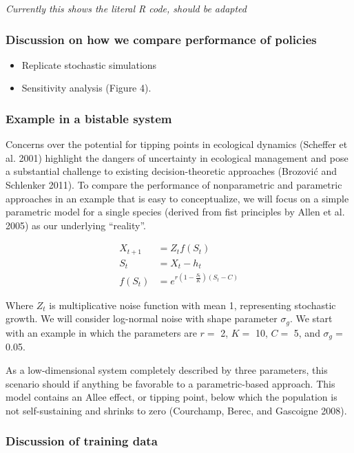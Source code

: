 \documentclass[author-year, review]{elsarticle} %
\begin{document}
\emph{Currently this shows the literal R code, should be adapted}

\subsubsection{Discussion on how we compare performance of policies}

\begin{itemize}
\itemsep1pt\parskip0pt
\item
  Replicate stochastic simulations
\item
  Sensitivity analysis (Figure 4).
\end{itemize}

\subsubsection{Example in a bistable system}

Concerns over the potential for tipping points in ecological dynamics
(Scheffer et al. 2001) highlight the dangers of uncertainty in
ecological management and pose a substantial challenge to existing
decision-theoretic approaches (Brozović and Schlenker 2011). To compare
the performance of nonparametric and parametric approaches in an example
that is easy to conceptualize, we will focus on a simple parametric
model for a single species (derived from fist principles by Allen et al.
2005) as our underlying ``reality''.

\begin{align}
X_{t+1} &= Z_t f(S_t) \\
S_t &= X_t - h_t \\
f(S_t) &= e^{r \left(1 - \frac{S_t}{K}\right)\left(S_t - C\right)}
\end{align}

Where $Z_t$ is multiplicative noise function with mean 1, representing
stochastic growth. We will consider log-normal noise with shape
parameter $\sigma_g$. We start with an example in which the parameters
are $r =$ 2, $K =$ 10, $C =$ 5, and $\sigma_g =$ 0.05.

As a low-dimensional system completely described by three parameters,
this scenario should if anything be favorable to a parametric-based
approach. This model contains an Allee effect, or tipping point, below
which the population is not self-sustaining and shrinks to zero
(Courchamp, Berec, and Gascoigne 2008).

\subsubsection{Discussion of training data}
\end{document}
